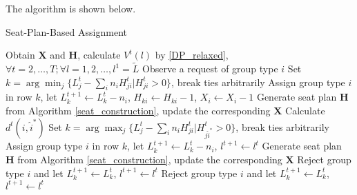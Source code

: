 The algorithm is shown below.

\begin{algorithm}[H]
  \caption{Seat-Plan-Based Assignment}
  Obtain $\bm{X}$ and $\bm{H}$, calculate $V^{t}(l)$ by \eqref{DP_relaxed}, $\forall t =2, \ldots, T; \forall l = 1,2, \ldots, l^{1}=\tilde{L}$\;
  {Observe a request of group type ${i}$\;
    {
    {Set $k = \arg \min_{j} \{L_j^{t} - \sum_{i}n_i H^{t}_{ji}|H^{t}_{ji} >0\}$, break ties arbitrarily\; 
     Assign group type $i$ in row $k$, let $L_{k}^{t+1} \gets L_{k}^{t}- n_{i}$, $H_{ki} \gets H_{ki}-1$, $X_{i}\gets X_{i}-1$\;
    {Generate seat plan $\bm{H}$ from Algorithm \ref{seat_construction}, update the corresponding $\bm{X}$\;}}
    {Calculate $d^{t}({i}, \hat{i}^{*})$\;
    {Set $k = \arg \max_{j} \{L_j^{t} - \sum_{i}n_i H_{ji}^{t}|H_{j\hat{i}^{*}}^{t} >0\}$, break ties arbitrarily\;
     Assign group type $i$ in row $k$, let $L_{k}^{t+1} \gets L_{k}^{t}- n_{i}$, $l^{t+1} \gets l^{t}$\;
    Generate seat plan $\bm{H}$ from Algorithm \ref{seat_construction}, update the corresponding $\bm{X}$\;}
    {Reject group type ${i}$ and let $L_{k}^{t+1} \gets L_{k}^{t}$, $l^{t+1} \gets l^{t}$\;}}}
    {Reject group type ${i}$ and let $L_{k}^{t+1} \gets L_{k}^{t}$, $l^{t+1} \gets l^{t}$\;}}
\end{algorithm}
